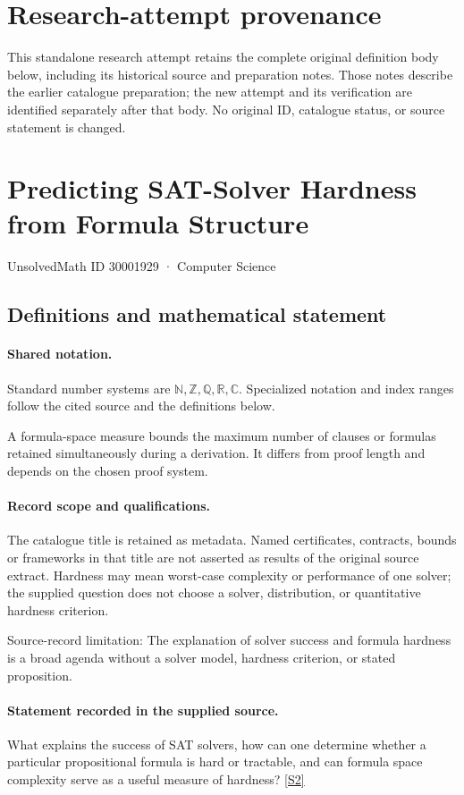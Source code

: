 \documentclass[11pt]{article}
\begin{document}
\section*{Research-attempt provenance}
This standalone research attempt retains the complete original definition body below,
including its historical source and preparation notes. Those notes describe the
earlier catalogue preparation; the new attempt and its verification are identified
separately after that body. No original ID, catalogue status, or source statement is changed.

\section{Predicting SAT-Solver Hardness from Formula Structure}\label{30001929}
{\small UnsolvedMath ID 30001929 · Computer Science}
\subsection{Definitions and mathematical statement}

\paragraph{Shared notation.}Standard number systems are $\mathbb N,\mathbb Z,\mathbb Q,\mathbb R,\mathbb C$. Specialized notation and index ranges follow the cited source and the definitions below.


A formula-space measure bounds the maximum number of clauses or formulas retained simultaneously during a derivation. It differs from proof length and depends on the chosen proof system.
\paragraph{Record scope and qualifications.}
The catalogue title is retained as metadata. Named certificates, contracts, bounds or frameworks in that title are not asserted as results of the original source extract.
Hardness may mean worst-case complexity or performance of one solver; the supplied question does not choose a solver, distribution, or quantitative hardness criterion.

Source-record limitation: The explanation of solver success and formula hardness is a broad agenda without a solver model, hardness criterion, or stated proposition.
\paragraph{Statement recorded in the supplied source.}
What explains the success of SAT solvers, how can one determine whether a particular propositional formula is hard or tractable, and can formula space complexity serve as a useful measure of hardness? \href{https://doi.org/10.4171/owr/2011/52}{[S2]}
\end{document}

